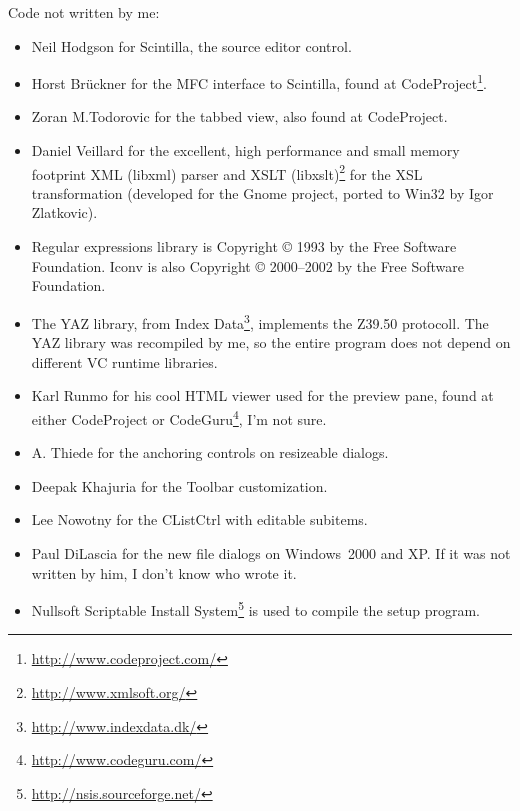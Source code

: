 \documentclass[oneside,10pt]{article}
\begin{document}
Code not written by me:
\begin{itemize}
  \item Neil Hodgson for Scintilla, the source editor control.
  \item Horst Br\"uckner for the MFC interface to Scintilla, found at CodeProject\footnote{\url{http://www.codeproject.com/}}.
  \item Zoran M.Todorovic for the tabbed view, also found at CodeProject.
  \item Daniel Veillard for the excellent, high performance and small memory footprint
    XML (libxml) parser and XSLT (libxslt)\footnote{\url{http://www.xmlsoft.org/}}
    for the XSL transformation (developed for the Gnome project, ported to Win32
    by Igor Zlatkovic).
  \item Regular expressions library is Copyright \copyright{} 1993 by the Free
    Software Foundation. Iconv is also Copyright \copyright{} 2000--2002 by the
    Free Software Foundation.
  \item The YAZ library, from Index Data\footnote{\url{http://www.indexdata.dk/}},
    implements the Z39.50 protocoll. The YAZ library was recompiled by me, so the
    entire program does not depend on different VC runtime libraries.
  \item Karl Runmo for his cool HTML viewer used for the preview pane, found at
    either CodeProject or CodeGuru\footnote{\url{http://www.codeguru.com/}}, I'm
    not sure.
  \item A. Thiede for the anchoring controls on resizeable dialogs.
  \item Deepak Khajuria for the Toolbar customization.
  \item Lee Nowotny for the CListCtrl with editable subitems.
  \item Paul DiLascia for the new file dialogs on Windows~2000 and XP. If it was
    not written by him, I don't know who wrote it.
  \item Nullsoft Scriptable Install System\footnote{\url{http://nsis.sourceforge.net/}}
    is used to compile the setup program.
\end{itemize}




\end{document}

